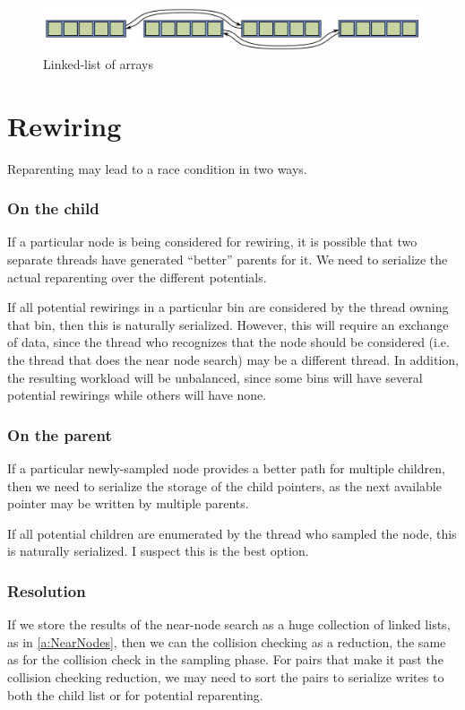 \begin{figure}[H]
\begin{centering}
    \includegraphics[scale=1]{fig/child_list}
    \caption{Linked-list of arrays}
\end{centering} 
\end{figure}


\section{Rewiring}

Reparenting may lead to a race condition in two ways. 

\subsubsection{On the child}
If a particular node is being considered for rewiring, it is possible that two separate threads have generated ``better'' parents for it. We need to serialize the actual reparenting over the different potentials. 

If all potential rewirings in a particular bin are considered by the thread owning that bin, then this is naturally serialized. However, this will require an exchange of data, since the thread who recognizes that the node should be considered (i.e. the thread that does the near node search) may be a different thread. In addition, the resulting workload will be unbalanced, since some bins will have several potential rewirings while others will have none.


\subsubsection{On the parent}
If a particular newly-sampled node provides a better path for multiple children, then we need to serialize the storage of the child pointers, as the next available pointer may be written by multiple parents. 

If all potential children are enumerated by the thread who sampled the node, this is naturally serialized. I suspect this is the best option. 

\subsubsection{Resolution}
If we store the results of the near-node search as a huge collection of linked lists, as in \ref{a:NearNodes}, then we can the collision checking as a reduction, the same as for the collision check in the sampling phase. For pairs that make it past the collision checking reduction, we may need to sort the pairs to serialize writes to both the child list or for potential reparenting. 

